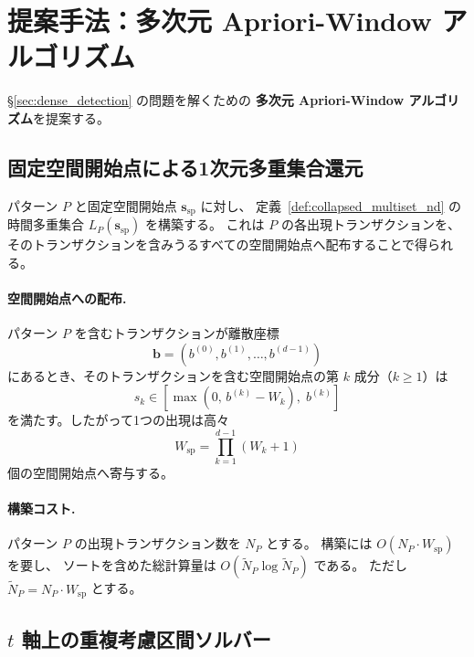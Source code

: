 \section{提案手法：多次元 Apriori-Window アルゴリズム}
\label{sec:method}

\S\ref{sec:dense_detection} の問題を解くための
\textbf{多次元 Apriori-Window アルゴリズム}を提案する。

\subsection{固定空間開始点による1次元多重集合還元}\label{sec:binsearch}

パターン $P$ と固定空間開始点 $\bm{s}_{\mathrm{sp}}$ に対し、
定義~\ref{def:collapsed_multiset_nd} の時間多重集合
$L_P(\bm{s}_{\mathrm{sp}})$ を構築する。
これは $P$ の各出現トランザクションを、
そのトランザクションを含みうるすべての空間開始点へ配布することで得られる。

\paragraph{空間開始点への配布.}
パターン $P$ を含むトランザクションが離散座標
\[
  \bm{b} = (b^{(0)}, b^{(1)}, \ldots, b^{(d-1)})
\]
にあるとき、そのトランザクションを含む空間開始点の第 $k$ 成分（$k \geq 1$）は
\[
  s_k \in [\max(0,\, b^{(k)} - W_k),\; b^{(k)}]
\]
を満たす。したがって1つの出現は高々
\[
  W_{\mathrm{sp}} = \prod_{k=1}^{d-1} (W_k + 1)
\]
個の空間開始点へ寄与する。

\paragraph{構築コスト.}
パターン $P$ の出現トランザクション数を $N_P$ とする。
構築には $O(N_P \cdot W_{\mathrm{sp}})$ を要し、
ソートを含めた総計算量は $O(\widetilde N_P \log \widetilde N_P)$ である。
ただし $\widetilde N_P = N_P \cdot W_{\mathrm{sp}}$ とする。

\subsection{$t$ 軸上の重複考慮区間ソルバー}\label{sec:t_stride}

